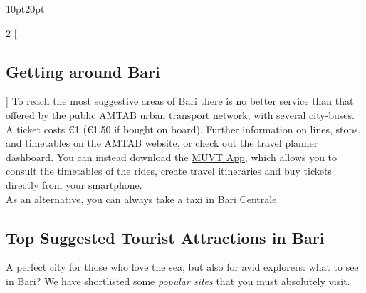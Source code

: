 \documentclass[
	openany, %
	parskip=full, %
	12pt, %
	a4paper, %
]{conferencebooklet} %
\begin{document}
\newpage
\begin{adjustwidth}{10pt}{20pt}
\begin{multicols}{2}
[\subsection*{Getting around Bari}]
To reach the most suggestive areas of Bari there is no better service than that offered by the public \color{blue}\href{http://ro.autobus.it/TP/amtab/lines.aspx}{AMTAB} \color{black} urban transport network, with several city-buses. \\
A ticket costs €1 (€1.50 if bought on board). Further information on lines, stops, and timetables on the AMTAB website, or check out the travel planner dashboard. You can instead download the \color{blue}\href{https://www.muvt.app/}{MUVT App}\color{black}, which allows you to consult the timetables of the rides, create travel itineraries and buy tickets directly from your smartphone. \\
As an alternative, you can always take a taxi in Bari Centrale.
\end{multicols}


\subsection*{Top Suggested Tourist Attractions in Bari}
\vspace{-5mm}
A perfect city for those who love the sea, but also for avid explorers: what to see in Bari? We have shortlisted some \textit{popular sites} that you must absolutely visit.

\begin{table}[h!]
\end{table}
\end{adjustwidth}
\end{document}
